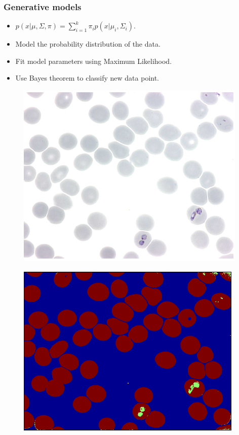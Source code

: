\documentclass{beamer}
\begin{document}
\begin{frame}
\frametitle{Generative models}
\begin{itemize}
	\item \(p(x|\mu,\Sigma,\pi) = \sum_{i=1}^{k}\pi_i p(x|\mu_i,\Sigma_i) \).
		\item Model the probability distribution of the data.
	\item Fit model parameters using Maximum Likelihood.
	\item Use Bayes theorem to classify new data point.

\end{itemize}

\begin{figure}
	\centering
	\begin{minipage}{.5\textwidth}
		\centering
		\includegraphics[width=.8\linewidth]{imagenes/malaria.png}
	
		\label{fig:malaria}
	\end{minipage}%
	\begin{minipage}{.5\textwidth}
		\centering
		\includegraphics[width=.8\linewidth]{imagenes/MalariaSegmented.png}
		
		\label{fig:malariasegmented}
	\end{minipage}
\end{figure}



\end{frame}
\end{document}
